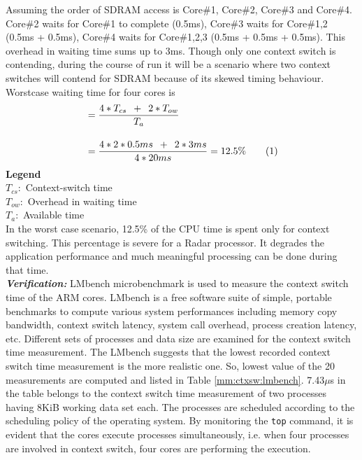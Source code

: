 Assuming the order of SDRAM access is Core\#1, Core\#2, Core\#3 and Core\#4. Core\#2 waits for Core\#1 to complete (0.5ms), Core\#3 waits for Core\#1,2 (0.5ms + 0.5ms), Core\#4 waits for Core\#1,2,3 (0.5ms + 0.5ms + 0.5ms). This overhead in waiting time sums up to 3ms. Though only one context switch is contending, during the course of run it will be a scenario where two context switches will contend for SDRAM because of its skewed timing behaviour. Worstcase waiting time for four cores is 
\begin{align*}
	& = \frac{4*T_{cs} \enspace + \enspace 2*T_{ow}}{T_{a}} \\[0.4cm]
	& = \frac{4*2*0.5ms \enspace + \enspace 2*3ms}{4*20ms} = 12.5\% \stepcounter{equation}\tag{\theequation} 
\end{align*}
\noindent
\textbf{Legend} \\
\tab $T_{cs}:$ Context-switch time \\
\tab $T_{ow}:$ Overhead in waiting time \\
\tab $T_{a}:$ Available time \\

In the worst case scenario, 12.5\% of the CPU time is spent only for context switching. This percentage is severe for a Radar processor. It degrades the application performance and much meaningful processing can be done during that time. \\

\textbf{\textsl{Verification:}} LMbench microbenchmark\cite{lmbench} is used to measure the context switch time of the ARM cores. LMbench is a free software suite of simple, portable benchmarks to compute various system performances including memory copy bandwidth, context switch latency, system call overhead, process creation latency, etc. Different sets of processes and data size are examined for the context switch time measurement. The LMbench suggests that the lowest recorded context switch time measurement is the more realistic one. So, lowest value of the 20 measurements are computed and listed in Table \ref{mm:ctxsw:lmbench}. 7.43$\mu$s in the table belongs to the context switch time measurement of two processes having 8KiB working data set each. The processes are scheduled according to the scheduling policy of the operating system. By monitoring the \verb|top| command, it is evident that the cores execute processes simultaneously, i.e. when four processes are involved in context switch, four cores are performing the execution.

